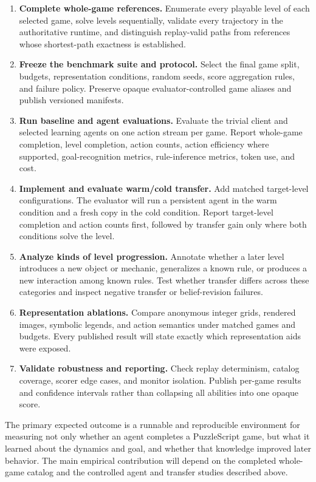 \documentclass[a4paper,11pt]{article}
\begin{document}
\begin{enumerate}[leftmargin=*,label=\textbf{Task \arabic*:}]
  \item \textbf{Complete whole-game references.}
    Enumerate every playable level of each selected game, solve levels
    sequentially, validate every trajectory in the authoritative runtime, and
    distinguish replay-valid paths from references whose shortest-path
    exactness is established.

  \item \textbf{Freeze the benchmark suite and protocol.}
    Select the final game split, budgets, representation conditions, random
    seeds, score aggregation rules, and failure policy. Preserve opaque
    evaluator-controlled game aliases and publish versioned manifests.

  \item \textbf{Run baseline and agent evaluations.}
    Evaluate the trivial client and selected learning agents on one action
    stream per game. Report whole-game completion, level completion, action
    counts, action efficiency where supported, goal-recognition metrics,
    rule-inference metrics, token use, and cost.

  \item \textbf{Implement and evaluate warm/cold transfer.}
    Add matched target-level configurations. The evaluator will run a persistent
    agent in the warm condition and a fresh copy in the cold condition. Report
    target-level completion and action counts first, followed by transfer gain
    only where both conditions solve the level.

  \item \textbf{Analyze kinds of level progression.}
    Annotate whether a later level introduces a new object or mechanic,
    generalizes a known rule, or produces a new interaction among known rules.
    Test whether transfer differs across these categories and inspect negative
    transfer or belief-revision failures.

  \item \textbf{Representation ablations.}
    Compare anonymous integer grids, rendered images, symbolic legends, and
    action semantics under matched games and budgets. Every published result
    will state exactly which representation aids were exposed.

  \item \textbf{Validate robustness and reporting.}
    Check replay determinism, catalog coverage, scorer edge cases, and monitor
    isolation. Publish per-game results and confidence intervals rather than
    collapsing all abilities into one opaque score.
\end{enumerate}

The primary expected outcome is a runnable and reproducible environment for
measuring not only whether an agent completes a PuzzleScript game, but what it
learned about the dynamics and goal, and whether that knowledge improved later
behavior. The main empirical contribution will depend on the completed
whole-game catalog and the controlled agent and transfer studies described
above.

\newpage


\end{document}

